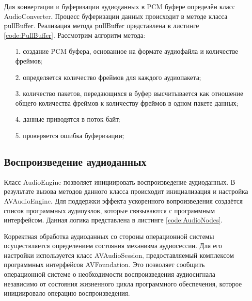         

        

        \par Для конвертации и буферизации аудиоданных в PCM буфере определён класс AudioConverter. 
        Процесс буферизации данных происходит в методе класса pullBuffer.
        Реализация метода pullBuffer представлена в листинге \ref{code:PullBuffer}.
        Рассмотрим алгоритм метода:
        \begin{itemize}
            \item[1.] создание PCM буфера, основанное на формате аудиофайла и количестве фреймов;
            \item[2.] определяется количество фреймов для каждого аудиопакета;
            \item[3.] количество пакетов, передающихся в буфер высчитывается как отношение общего количества фреймов к количеству фреймов в одном пакете данных;
            \item[4.] данные приводятся в поток байт;
            \item[5.] проверяется ошибка буферизации;
        \end{itemize}

        
        
    \subsection{Воспроизведение аудиоданных}
        \par Класс AudioEngine позволяет инициировать воспроизведение аудиоданных. 
        В результате вызова методов данного класса происходит инициализация и настройка AVAudioEngine.
        Для поддержки эффекта ускоренного вопроизведения создаётся список программных аудиоузлов, 
        которые связываются с программным интерфейсом. Данная логика представлена в листинге \ref{code:AudioNodes}.

        \par Корректная обработка аудиоданных со стороны операционной системы осуществляется определением состояния механизма аудиосессии.
        Для его настройки используется класс AVAudioSession, предоставляемый комплексом программных интерфейсов AVFoundation.
        Это позволяет сообщить операционной системе о необходимости воспроизведения аудиосигнала 
        независимо от состояния жизненного цикла программного обеспечения, которое инициировало операцию воспроизведения.

